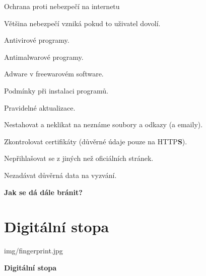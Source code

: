 \documentclass[aspectratio=169]{beamer}
\begin{document}
\begin{frame}{Ochrana proti nebezpečí na internetu}
    \begin{cardTiny}
        \begin{flushleft}
            Většina nebezpečí vzniká pokud to uživatel dovolí.

            Antivirové programy.

            Antimalwarové programy.

            Adware v freewarovém software.

            Podmínky při instalaci programů.

            Pravidelné aktualizace.

            Nestahovat a neklikat na neznáme soubory a odkazy (a emaily).

            Zkontrolovat certifikáty (důvěrné údaje pouze na HTTP\textbf{S}).
            
            Nepřihlašovat se z jiných než oficiálních stránek.
            
            Nezadávat důvěrná data na vyzvání.
        \end{flushleft}
    \end{cardTiny}
    \begin{cardTiny}
        \begin{center}
            \textbf{Jak se dá dále bránit?}
        \end{center}
    \end{cardTiny}
\end{frame}


\section{Digitální stopa}

\begin{frameImg}[width]{img/fingerprint.jpg}
    \vspace*{60mm}
    \begin{cardTiny}
        \vspace*{\fill}
        \begin{center}
            \textbf{Digitální stopa}
        \end{center}
    \end{cardTiny}
\end{frameImg}
\end{document}
